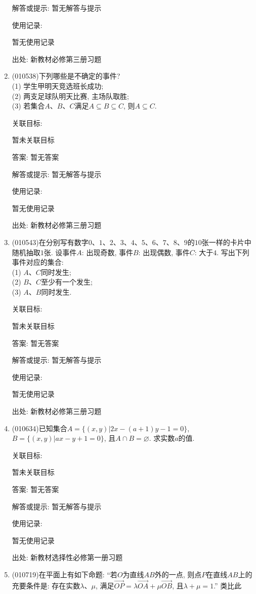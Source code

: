 \documentclass[10pt,a4paper]{article}
\begin{document}
\begin{enumerate}[1.]
解答或提示: 暂无解答与提示

使用记录:

暂无使用记录


出处: 新教材必修第三册习题
\item { (010538)}下列哪些是不确定的事件?\\
(1) 学生甲明天竞选班长成功;\\
(2) 两支足球队明天比赛, 主场队取胜;\\
(3) 若集合$A$、$B$、$C$满足$A\subseteq B\subseteq C$, 则$A\subseteq C$.


关联目标:

暂未关联目标

答案: 暂无答案

解答或提示: 暂无解答与提示

使用记录:

暂无使用记录


出处: 新教材必修第三册习题
\item { (010543)}在分别写有数字$0$、$1$、$2$、$3$、$4$、$5$、$6$、$7$、$8$、$9$的$10$张一样的卡片中随机抽取$1$张. 设事件$A$: 出现奇数, 事件$B$: 出现偶数, 事件$C$: 大于$4$. 写出下列事件对应的集合:\\
(1) $A$、$C$同时发生;\\
(2) $B$、$C$至少有一个发生;\\
(3) $A$、$B$同时发生.


关联目标:

暂未关联目标

答案: 暂无答案

解答或提示: 暂无解答与提示

使用记录:

暂无使用记录


出处: 新教材必修第三册习题
\item { (010634)}已知集合$A=\{(x, y)|2x-(a+1)y-1=0\}$, $B=\{(x, y)|ax-y+1=0\}$, 且$A\cap B=\varnothing$. 求实数$a$的值.


关联目标:

暂未关联目标

答案: 暂无答案

解答或提示: 暂无解答与提示

使用记录:

暂无使用记录


出处: 新教材选择性必修第一册习题
\item { (010719)}在平面上有如下命题: ``若$O$为直线$AB$外的一点, 则点$P$在直线$AB$上的充要条件是: 存在实数$\lambda$、$\mu$, 满足$\overrightarrow{OP}=\lambda \overrightarrow{OA}+\mu \overrightarrow{OB}$, 且$\lambda +\mu=1$.'' 类比此



\end{enumerate}
\end{document}
